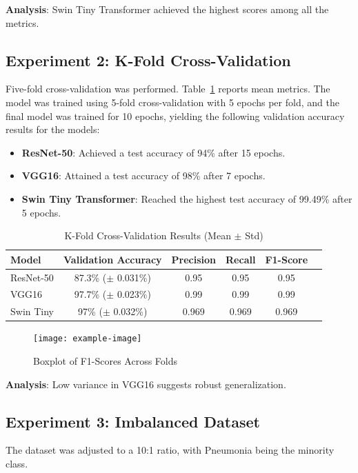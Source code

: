 \documentclass[12pt, a4paper]{article}
\begin{document}
\textbf{Analysis}: Swin Tiny Transformer achieved the highest scores among all the metrics.

\subsection{Experiment 2: K-Fold Cross-Validation}
Five-fold cross-validation was performed. Table~\ref{tab:kfold} reports mean metrics. The model was trained using 5-fold cross-validation with 5 epochs per fold, and the final model was trained for 10 epochs, yielding the following validation accuracy results for the models:
\begin{itemize}
\item \textbf{ResNet-50}: Achieved a test accuracy of 94\% after 15 epochs.
\item \textbf{VGG16}: Attained a test accuracy of 98\% after 7 epochs.
\item \textbf{Swin Tiny Transformer}: Reached the highest test accuracy of 99.49\% after 5 epochs.
\end{itemize}

\begin{table}[h]
    \centering
    \caption{K-Fold Cross-Validation Results (Mean $\pm$ Std)}
    \label{tab:kfold}
\begin{tabular}{lccccc}
    \toprule
    Model & Validation Accuracy & Precision & Recall & F1-Score \\
    \midrule
    ResNet-50 & 87.3\% ($\pm$ 0.031\%) & 0.95  & 0.95  & 0.95  \\
    VGG16 & 97.7\% ($\pm$ 0.023\%) & 0.99 & 0.99  & 0.99  \\
    Swin Tiny & 97\% ($\pm$ 0.032\%) & 0.969  & 0.969  & 0.969  \\
    \bottomrule
\end{tabular}
\end{table}

\begin{figure}[h]
    \centering
    \texttt{[image: example-image]} %
    \caption{Boxplot of F1-Scores Across Folds}
    \label{fig:boxplot_kfold}
\end{figure}

\textbf{Analysis}: Low variance in VGG16 suggests robust generalization.

\subsection{Experiment 3: Imbalanced Dataset}
The dataset was adjusted to a 10:1 ratio, with Pneumonia being the minority class. 
\end{document}
